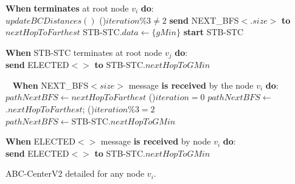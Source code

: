 {	\BlankLine	
	\BlankLine
	{\bf When} \cheungCbAgg{} {\bf terminates} at root node $v_i$ {\bf do}:\\
	$updateBCDistances()$\;
	\eIf(){$iteration\%3 \neq 2$}
	{
		{\bf send} NEXT\_BFS${<}$\cheungCbAgg{}$.size{>}$ {\bf to} $nextHopToFarthest$\;
	} {
		STB-STC$.data \gets \{gMin\}$\label{line:abc-centerv2-distributed-stbtsc-gmin-1}\;
		{\bf start} STB-STC\label{line:abc-centerv2-distributed-stbtsc-start}\;
	}
	
	\BlankLine	
	\BlankLine
	{\bf When} STB-STC terminates at root node $v_j$ {\bf do}:\\
	 {
		{\bf send} ELECTED${<}{>}$ {\bf to} STB-STC.$nextHopToGMin$\label{alg:centrality:line:abc-centerv2-distributed-elected-msg-1}\;
	}		
	
	\BlankLine	
	\BlankLine
	\nonl~
	{\bf When} NEXT\_BFS${<}size{>}$ message {\bf is received} by the node $v_i$ {\bf do}:\label{alg:centrality:line:abc-center-v2-next-bfs-3}\\
	$pathNextBFS \gets nextHopToFarthest$\;		
	\If(){$iteration = 0$}{
		$pathNextBFS \gets$ \cheungIeCbAgg{}$.nextHopToFarthest$;		
	}	
	\If(){$iteration \% 3 = 2$} { $pathNextBFS \gets \text{STB-STC}.nextHopToGMin$\;			
	}		
	
	\BlankLine	
	\BlankLine
	{\bf When} ELECTED${<}{>}$ message {\bf is received} by node $v_i$ {\bf do}:\label{alg:centrality:line:abc-centerv2-distributed-elected-msg-2}\\
	 {
		{\bf send} ELECTED${<}{>}$ {\bf to} STB-STC.$nextHopToGMin$\;
		\label{alg:centrality:line:abc-centerv2-distributed-elected-msg-3}
	}
}{	
	\caption{ABC-CenterV2 detailed for any node $v_i$.\label{alg:centrality:abc-center-v2-distributed}}
}


